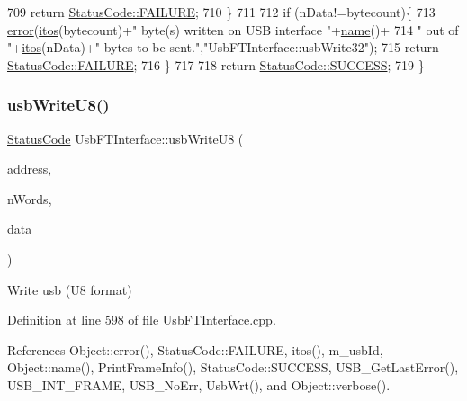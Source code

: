 \begin{DoxyCode}
709     \textcolor{keywordflow}{return} \hyperlink{classStatusCode_a6f565cbeadc76d14c72f047e5e85eb4ba3da73d4c469762eb9d3c960368252b26}{StatusCode::FAILURE};
710   \}
711 
712   \textcolor{keywordflow}{if} (nData!=bytecount)\{
713     \hyperlink{classObject_a204a95f57818c0f811933917a30eff45}{error}(\hyperlink{Tools_8h_af330027dbdafb9a30768b3613c553e60}{itos}(bytecount)+\textcolor{stringliteral}{" byte(s) written on USB interface "}+\hyperlink{classObject_a300f4c05dd468c7bb8b3c968868443c1}{name}()+
714             \textcolor{stringliteral}{" out of "}+\hyperlink{Tools_8h_af330027dbdafb9a30768b3613c553e60}{itos}(nData)+\textcolor{stringliteral}{" bytes to be sent."},\textcolor{stringliteral}{"UsbFTInterface::usbWrite32"});
715     \textcolor{keywordflow}{return} \hyperlink{classStatusCode_a6f565cbeadc76d14c72f047e5e85eb4ba3da73d4c469762eb9d3c960368252b26}{StatusCode::FAILURE};    
716   \}
717 
718   \textcolor{keywordflow}{return} \hyperlink{classStatusCode_a6f565cbeadc76d14c72f047e5e85eb4badd0da38d3ba0d922efd1f4619bc37ad8}{StatusCode::SUCCESS};  
719 \}
\end{DoxyCode}
\mbox{\label{classUsbFTInterface_a8aeebce6a10aa88c19cfa663b47b389a}} 
\subsubsection{\texorpdfstring{usb\+Write\+U8()}{usbWriteU8()}}
{\footnotesize\ttfamily \hyperlink{classStatusCode}{Status\+Code} Usb\+F\+T\+Interface\+::usb\+Write\+U8 (\begin{DoxyParamCaption}\item[{unsigned long int}]{address,  }\item[{unsigned long int}]{n\+Words,  }\item[{unsigned char $\ast$}]{data }\end{DoxyParamCaption})}

Write usb (U8 format) 

Definition at line 598 of file Usb\+F\+T\+Interface.\+cpp.



References Object\+::error(), Status\+Code\+::\+F\+A\+I\+L\+U\+RE, itos(), m\+\_\+usb\+Id, Object\+::name(), Print\+Frame\+Info(), Status\+Code\+::\+S\+U\+C\+C\+E\+SS, U\+S\+B\+\_\+\+Get\+Last\+Error(), U\+S\+B\+\_\+\+I\+N\+T\+\_\+\+F\+R\+A\+ME, U\+S\+B\+\_\+\+No\+Err, Usb\+Wrt(), and Object\+::verbose().



